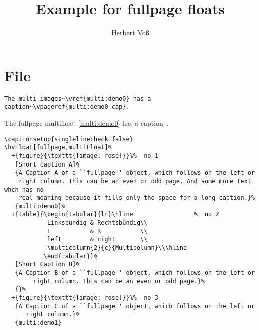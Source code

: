 \documentclass[twoside,twocolumn]{scrartcl}
\begin{document}
\title{Example for fullpage floats}
\author{Herbert Voß}
\maketitle

\tableofcontents

\blinddocument

\section{File \texttt{\jobname}}

\begin{lstlisting}
The multi images~\vref{multi:demo0} has a caption~\vpageref{multi:demo0-cap}.
\end{lstlisting}

The fullpage multifloat~\vref{multi:demo0} has a caption~.



\begin{lstlisting}
\captionsetup{singlelinecheck=false}
\hvFloat[fullpage,multiFloat]%
  +{figure}{\texttt{[image: rose]}}%%  no 1
   [Short caption A]%
   {A Caption A of a ``fullpage'' object, which follows on the left or
    right column. This can be an even or odd page. And some more text whch has no
    real meaning because it fills only the space for a long caption.}%
   {multi:demo0}%
  +{table}{\begin{tabular}{lr}\hline                 %  no 2
            Linksbündig & Rechtsbündig\\
            L           & R           \\
            left        & right       \\
            \multicolumn{2}{c}{Multicolumn}\\\hline
           \end{tabular}}%
   [Short Caption B]%
   {A Caption B of a ``fullpage'' object, which follows on the left or
        right column. This can be an even or odd page.}%
   {}%
  +{figure}{\texttt{[image: rose]}}%%  no 3
   {A Caption C of a ``fullpage'' object, which follows on the left or
      right column.}%
   {multi:demo1}
\end{lstlisting}
\end{document}
